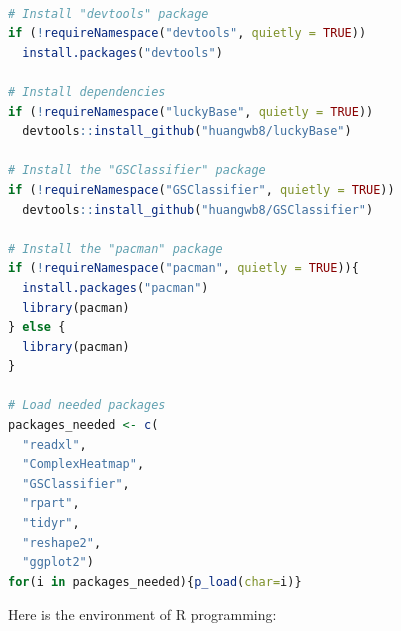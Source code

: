 \documentclass[
  12pt,
]{book}
\begin{document}
\begin{lstlisting}[language=R]

# Install "devtools" package
if (!requireNamespace("devtools", quietly = TRUE))
  install.packages("devtools")

# Install dependencies
if (!requireNamespace("luckyBase", quietly = TRUE))
  devtools::install_github("huangwb8/luckyBase")

# Install the "GSClassifier" package
if (!requireNamespace("GSClassifier", quietly = TRUE))
  devtools::install_github("huangwb8/GSClassifier")

# Install the "pacman" package
if (!requireNamespace("pacman", quietly = TRUE)){
  install.packages("pacman")
  library(pacman)
} else {
  library(pacman)
}

# Load needed packages
packages_needed <- c(
  "readxl",
  "ComplexHeatmap",
  "GSClassifier",
  "rpart",
  "tidyr",
  "reshape2",
  "ggplot2")
for(i in packages_needed){p_load(char=i)}
\end{lstlisting}

Here is the environment of R programming:
\end{document}

